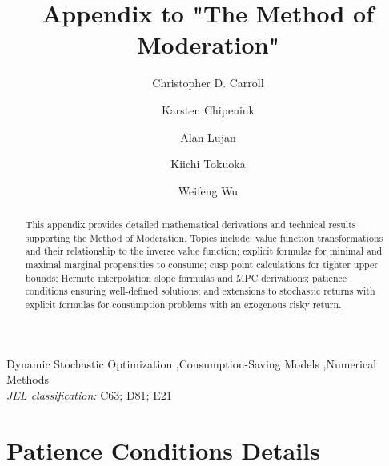 \documentclass[preprint,authoryear]{elsarticle}
\begin{document}
\begin{frontmatter}

\title{Appendix to "The Method of Moderation"}

\author[1,2]{Christopher D. Carroll}\author[3]{Karsten Chipeniuk}\author[1,2]{Alan Lujan}\author[4]{Kiichi Tokuoka}\author[5]{Weifeng Wu}


\begin{abstract}
This appendix provides detailed mathematical derivations and technical results supporting the Method of Moderation. Topics include: value function transformations and their relationship to the inverse value function; explicit formulas for minimal and maximal marginal propensities to consume; cusp point calculations for tighter upper bounds; Hermite interpolation slope formulas and MPC derivations; patience conditions ensuring well-defined solutions; and extensions to stochastic returns with explicit formulas for consumption problems with an exogenous risky return.
\end{abstract}

\begin{keyword}
Dynamic Stochastic Optimization \sep Consumption-Saving Models \sep Numerical Methods \\ \textit{JEL classification:} C63; D81; E21\end{keyword}

\end{frontmatter}

\section{Patience Conditions Details}
\end{document}
